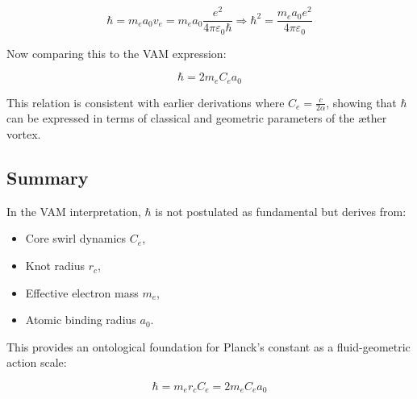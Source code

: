 \begin{equation}
    \hbar = m_e a_0 v_e = m_e a_0 \frac{e^2}{4\pi \varepsilon_0 \hbar} \Rightarrow \hbar^2 = \frac{m_e a_0 e^2}{4\pi \varepsilon_0}
\end{equation}

Now comparing this to the VAM expression:

\begin{equation}
    \boxed{\hbar = 2 m_e C_e a_0}
\end{equation}

This relation is consistent with earlier derivations where \( C_e = \frac{c}{2\alpha} \), showing that \( \hbar \) can be expressed in terms of classical and geometric parameters of the æther vortex.

\subsection*{Summary}

In the VAM interpretation, \( \hbar \) is not postulated as fundamental but derives from:

\begin{itemize}
    \item Core swirl dynamics \( C_e \),
    \item Knot radius \( r_c \),
    \item Effective electron mass \( m_e \),
    \item Atomic binding radius \( a_0 \).
\end{itemize}

This provides an ontological foundation for Planck's constant as a fluid-geometric action scale:

\begin{equation}
    \boxed{\hbar = m_e r_c C_e = 2 m_e C_e a_0}
\end{equation}
